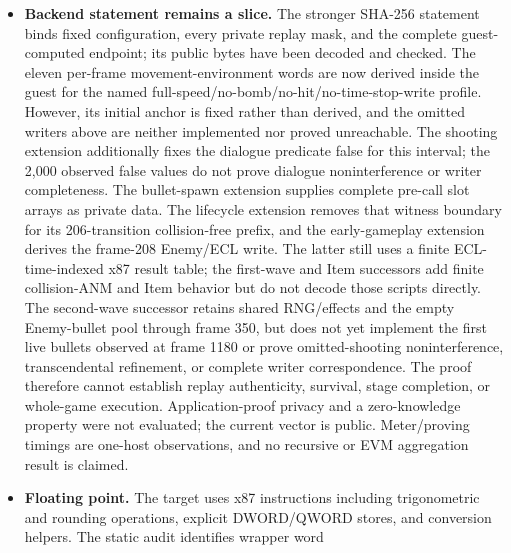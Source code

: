 \begin{itemize}
  drops, and explicitly empty Enemy-bullet state through frame 350.  It does not
  cover ranks 4--5, the other shot routes,
  laser paths, live enemy bullets, later ECL paths, or Player death.  Its dyadic rounding
  algorithm, reachable-domain checks, interior x87 control state, retail
  instruction binding, source-to-Rust correspondence, and projection
  noninterference are not yet machine-checked.  A tracked OpenVM application
  proof now binds the compiled guest, transcript digest, and result for this
  finite vector, but does not prove those refinement premises.
  \item \textbf{Backend statement remains a slice.}  The stronger SHA-256
  statement binds fixed configuration, every private replay mask, and the
  complete guest-computed endpoint; its public bytes have been decoded and
  checked.  The eleven per-frame movement-environment words are now derived
  inside the guest for the named full-speed/no-bomb/no-hit/no-time-stop-write
  profile.  However, its initial anchor is fixed rather than derived, and the
  omitted writers above are neither implemented nor proved unreachable.
  The shooting extension additionally fixes the dialogue predicate false for
  this interval; the 2,000 observed false values do not prove dialogue
  noninterference or writer completeness.
  The bullet-spawn extension supplies complete pre-call slot arrays as private
  data.  The lifecycle extension removes that witness boundary for its
  206-transition collision-free prefix, and the early-gameplay extension
  derives the frame-208 Enemy/ECL write.  The latter still uses a finite
  ECL-time-indexed x87 result table; the first-wave and Item successors add
  finite collision-ANM and Item behavior but do not decode those scripts
  directly.  The second-wave successor retains shared RNG/effects and the
  empty Enemy-bullet pool through frame 350, but does not yet implement the
  first live bullets observed at frame 1180 or prove omitted-shooting
  noninterference, transcendental refinement, or complete writer correspondence.
  The proof therefore cannot establish replay authenticity, survival, stage
  completion, or whole-game execution.  Application-proof privacy and a
  zero-knowledge property were not evaluated; the current vector is public.
  Meter/proving timings are one-host observations, and no recursive or EVM
  aggregation result is claimed.
  \item \textbf{Floating point.}  The target uses x87 instructions including
  trigonometric and rounding operations, explicit DWORD/QWORD stores, and
  conversion helpers.  The static audit identifies wrapper word

\end{itemize}
